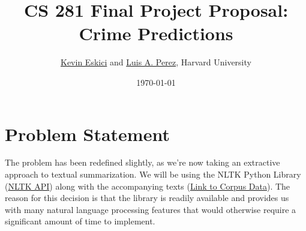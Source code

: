 \documentclass[10pt]{article}
\title{CS 281 Final Project Proposal: Crime Predictions}
\author{\href{mailto:keskici@college.harvard.edu}{Kevin Eskici} and \href{mailto:luisperez@college.harvard.edu}{Luis A. Perez}, Harvard University}
\date{\today}
\begin{document}
 \begin{center}
  \end{center}

\section{Problem Statement}
The problem has been redefined slightly, as we're now taking an extractive approach to textual summarization. We will be using the NLTK Python Library (\href{http://www.nltk.org/api/nltk.html}{NLTK API}) along with the accompanying texts (\href{http://www.nltk.org/nltk_data/}{Link to Corpus Data}). The reason for this decision is that the library is readily available and provides us with many natural language processing features that would otherwise require a significant amount of time to implement. \\
\end{document}
